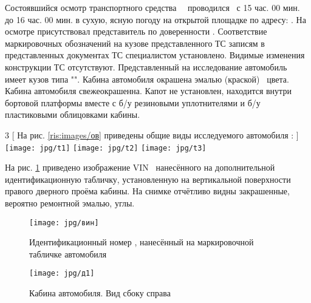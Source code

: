  {Состоявшийся осмотр транспортного средства \, \, проводился \osm\, с 15 час. 00 мин. до 16 час. 00 мин. в сухую, ясную погоду  на открытой площадке по адресу: . На осмотре присутствовал представитель по доверенности  .  %
		Соответствие маркировочных обозначений на кузове представленного ТС записям в представленных документах ТС  специалистом установлено. Видимые изменения конструкции ТС отсутствуют.  Представленный на исследование автомобиль \tc\, имеет кузов типа "". Кабина автомобиля окрашена 		эмалью (краской) \colr\, цвета. Кабина автомобиля свежеокрашенна. Капот не установлен, находится внутри бортовой платформы вместе с б/у резиновыми уплотнителями и б/у пластиковыми облицовками кабины.   
		
		
		
		\begin{multicols}{3}
			[
		На рис. \ref{ris:images/ов} приведены общие виды  исследуемого автомобиля :
			]
			\noindent	\texttt{[image: jpg/t1]}
			\columnbreak
			\texttt{[image: jpg/t2]}
			\columnbreak
			\texttt{[image: jpg/t3]}
			\end{multicols}			
				\label{ris:images/ов}
		
		\vspace{3mm}
		
		На рис. \ref{ris:images/вин} приведено изображение VIN \vin\, нанесённого на дополнительной идентификационную  табличку, установленную на вертикальной поверхности правого дверного проёма кабины.  На снимке отчётливо видны закрашенные, вероятно ремонтной эмалью, углы.
			
		
		\begin{figure}[H]
			\centering
			\texttt{[image: jpg/вин]}
			\caption{{\footnotesize {Идентификационный номер , нанесённый на маркировочной табличке автомобиля \, }}}
			\label{ris:images/вин}
		\end{figure}
		
		
		
		
		
		
\begin{figure}[H]
	\centering
	\texttt{[image: jpg/д1]}
	\caption{{\footnotesize {Кабина автомобиля. Вид сбоку справа}}}
	\label{справа}
\end{figure}






}
